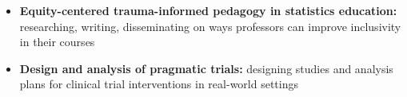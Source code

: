 
\begin{itemize}
\item \textbf{Equity-centered trauma-informed pedagogy in statistics education:} researching, writing, disseminating on ways professors can improve inclusivity in their courses
\item \textbf{Design and analysis of pragmatic trials:} designing studies and analysis plans for clinical trial interventions in real-world settings
\end{itemize}
